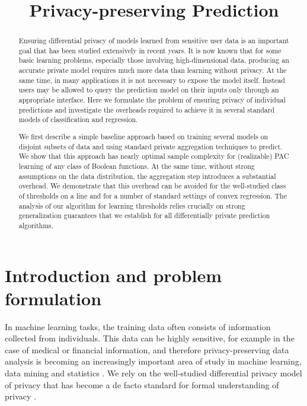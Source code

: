 \documentclass[final,12pt]{colt2018}
\begin{document}
\title{Privacy-preserving Prediction}

\date{}
\maketitle

\begin{abstract}
Ensuring differential privacy of models learned from sensitive user data is an important goal that has been studied extensively in recent years.
It is now known that for some basic learning problems, especially those involving high-dimensional data, producing an accurate private model requires much more data than learning without privacy. At the same time, in many applications it is not necessary to expose the model itself. Instead users may be allowed to query the prediction model on their inputs only through an appropriate interface. Here we formulate the problem of ensuring privacy of individual predictions and investigate the overheads required to achieve it in several standard models of classification and regression.

We first describe a simple baseline approach based on training several models on disjoint subsets of data and using standard private aggregation techniques to predict. We show that this approach has nearly optimal sample complexity for (realizable) PAC learning of any class of Boolean functions. At the same time, without strong assumptions on the data distribution, the aggregation step introduces a substantial overhead.
We demonstrate that this overhead can be avoided for the well-studied class of thresholds on a line and for a number of standard settings of convex regression. The analysis of our algorithm for learning thresholds relies crucially on strong generalization guarantees that we establish for all differentially private prediction algorithms.
\end{abstract}

\section{Introduction and problem formulation}
In machine learning tasks, the training data often consists of information collected
from individuals. This data can be highly sensitive, for example in the case
of medical or financial information, and therefore privacy-preserving data analysis is becoming an increasingly important area of study in machine learning, data mining and statistics \citep{DworkSmith:09,SarwateC:13,DworkRoth:14}. We rely on the well-studied differential privacy model of privacy that has become a de facto standard for formal understanding of privacy \citep{DworkMNS:06}.
\end{document}

